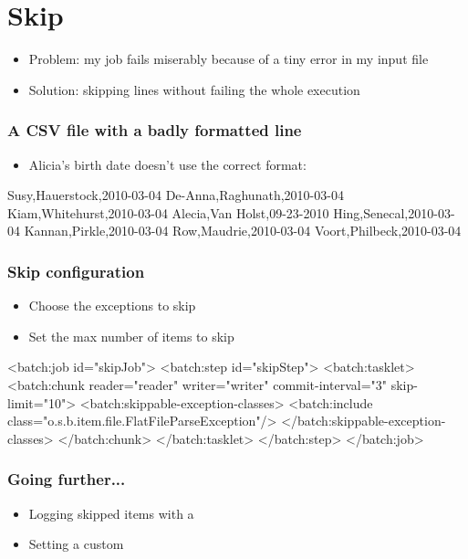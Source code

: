 \section{Skip}

\begin{frame}
 \begin{itemize}
  \item Problem: my job fails miserably because of a tiny error in my input file
  \item Solution: skipping lines without failing the whole execution
 \end{itemize}
\end{frame}

\begin{frame}[fragile]
 \frametitle{A CSV file with a badly formatted line}

\begin{itemize}
 \item Alicia's birth date doesn't use the correct format:
\end{itemize}
\begin{textcode}
Susy,Hauerstock,2010-03-04
De-Anna,Raghunath,2010-03-04
Kiam,Whitehurst,2010-03-04
Alecia,Van Holst,09-23-2010
Hing,Senecal,2010-03-04
Kannan,Pirkle,2010-03-04
Row,Maudrie,2010-03-04
Voort,Philbeck,2010-03-04
\end{textcode}
 
\end{frame}

\begin{frame}[fragile]
 \frametitle{Skip configuration}
 \begin{itemize}
  \item Choose the exceptions to skip
  \item Set the max number of items to skip
 \end{itemize}

 \begin{xmlcode}
<batch:job id="skipJob">
  <batch:step id="skipStep">
    <batch:tasklet>
      <batch:chunk reader="reader" writer="writer" commit-interval="3"
                   skip-limit="10">
        <batch:skippable-exception-classes>
          <batch:include
          class="o.s.b.item.file.FlatFileParseException"/>
        </batch:skippable-exception-classes>
      </batch:chunk>
    </batch:tasklet>
  </batch:step>
</batch:job>
\end{xmlcode}

\end{frame}

\begin{frame}
 \frametitle{Going further...}
 \begin{itemize} 
  \item Logging skipped items with a 
  \item Setting a custom 
 \end{itemize}
\end{frame}
